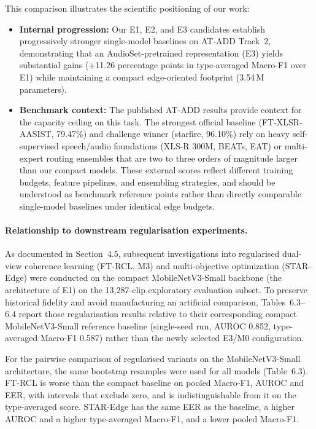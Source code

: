 \documentclass[12pt,a4paper]{report}
\begin{document}
This comparison illustrates the scientific positioning of our work:
\begin{itemize}
  \item \textbf{Internal progression:} Our E1, E2, and E3 candidates establish progressively stronger single-model baselines on AT-ADD Track~2, demonstrating that an AudioSet-pretrained representation (E3) yields substantial gains (+11.26 percentage points in type-averaged Macro-F1 over E1) while maintaining a compact edge-oriented footprint (3.54\,M parameters).
  \item \textbf{Benchmark context:} The published AT-ADD results provide context for the capacity ceiling on this task. The strongest official baseline (FT-XLSR-AASIST, 79.47\%) and challenge winner (starfire, 96.10\%) rely on heavy self-supervised speech/audio foundations (XLS-R 300M, BEATs, EAT) or multi-expert routing ensembles that are two to three orders of magnitude larger than our compact models. These external scores reflect different training budgets, feature pipelines, and ensembling strategies, and should be understood as benchmark reference points rather than directly comparable single-model baselines under identical edge budgets.
\end{itemize}

\paragraph{Relationship to downstream regularisation experiments.} As documented in Section~4.5, subsequent investigations into regularised dual-view coherence learning (FT-RCL, M3) and multi-objective optimization (STAR-Edge) were conducted on the compact MobileNetV3-Small backbone (the architecture of E1) on the 13{,}287-clip exploratory evaluation subset. To preserve historical fidelity and avoid manufacturing an artificial comparison, Tables~6.3--6.4 report those regularisation results relative to their corresponding compact MobileNetV3-Small reference baseline (single-seed run, AUROC 0.852, type-averaged Macro-F1 0.587) rather than the newly selected E3/M0 configuration.

For the pairwise comparison of regularised variants on the MobileNetV3-Small architecture, the same bootstrap resamples were used for all models (Table~6.3). FT-RCL is worse than the compact baseline on pooled Macro-F1, AUROC and EER, with intervals that exclude zero, and is indistinguishable from it on the type-averaged score. STAR-Edge has the same EER as the baseline, a higher AUROC and a higher type-averaged Macro-F1, and a lower pooled Macro-F1.
\end{document}
